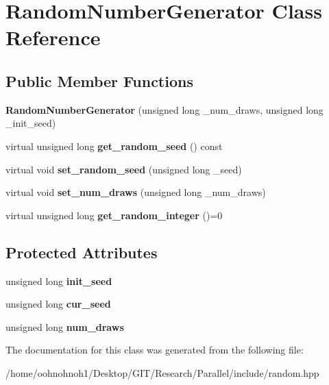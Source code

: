 \hypertarget{classRandomNumberGenerator}{}\section{Random\+Number\+Generator Class Reference}
\label{classRandomNumberGenerator}
\subsection*{Public Member Functions}
\begin{DoxyCompactItemize}
\item 
\mbox{\label{classRandomNumberGenerator_a3c8fac87aaf05fd80b39c3d881d8e465}} 
{\bfseries Random\+Number\+Generator} (unsigned long \+\_\+num\+\_\+draws, unsigned long \+\_\+init\+\_\+seed)
\item 
\mbox{\label{classRandomNumberGenerator_a1abb33d086cf9ca698454a87e2fbcfe3}} 
virtual unsigned long {\bfseries get\+\_\+random\+\_\+seed} () const
\item 
\mbox{\label{classRandomNumberGenerator_a8a96854df66b630996339014dcec6c33}} 
virtual void {\bfseries set\+\_\+random\+\_\+seed} (unsigned long \+\_\+seed)
\item 
\mbox{\label{classRandomNumberGenerator_abd8c1b4e02891640ba5eddf89f3d08b1}} 
virtual void {\bfseries set\+\_\+num\+\_\+draws} (unsigned long \+\_\+num\+\_\+draws)
\item 
\mbox{\label{classRandomNumberGenerator_a949da723a88fbb6ef9b23505853251c4}} 
virtual unsigned long {\bfseries get\+\_\+random\+\_\+integer} ()=0
\end{DoxyCompactItemize}
\subsection*{Protected Attributes}
\begin{DoxyCompactItemize}
\item 
\mbox{\label{classRandomNumberGenerator_ab860e8ce619a98070fd7b29ef121bab6}} 
unsigned long {\bfseries init\+\_\+seed}
\item 
\mbox{\label{classRandomNumberGenerator_ac5bf394b0cd712c9473e879ff9fbae05}} 
unsigned long {\bfseries cur\+\_\+seed}
\item 
\mbox{\label{classRandomNumberGenerator_a0861773ed7da3c6e1297053c117d809a}} 
unsigned long {\bfseries num\+\_\+draws}
\end{DoxyCompactItemize}


The documentation for this class was generated from the following file\+:\begin{DoxyCompactItemize}
\item 
/home/oohnohnoh1/\+Desktop/\+G\+I\+T/\+Research/\+Parallel/include/random.\+hpp\end{DoxyCompactItemize}
